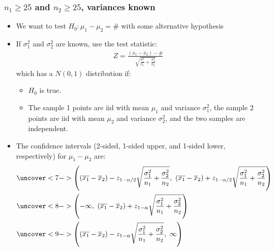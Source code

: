 \documentclass[handout]{beamer}\usepackage[]{graphicx}\usepackage[]{color}
\providecommand{\ov}[1]{\overline{#1}}
\numberwithin{equation}{section}
\begin{document}
\begin{frame}
\frametitle{$n_1 \ge 25$ and $n_2 \ge 25$, variances known} \scriptsize
\begin{itemize}
\item We want to test $H_0: \mu_1 - \mu_2 = \#$ with some alternative hypothesis
\pause \item If $\sigma^2_1$ and $\sigma_2^2$ are known, use the test statistic:
\pause \begin{align*}
Z = \frac{(\ov{x}_1 - \ov{x}_2) - \#}{\sqrt{\frac{\sigma^2_1}{n_1} + \frac{\sigma^2_2}{n_2}}}
\end{align*}
which has a $N(0,1)$ distribution if:
\begin{itemize}
\pause \item $H_0$ is true.
\pause \item The sample 1 points are iid with mean $\mu_1$ and variance $\sigma^2_1$, the sample 2 points are iid with mean $\mu_2$ and variance $\sigma^2_2$, and the two samples are independent.
\end{itemize}
\pause \item The confidence intervals (2-sided, 1-sided upper, and 1-sided lower, respectively) for $\mu_1 - \mu_2$ are:
\begin{align*}
&\uncover<7->{\left ((\ov{x_1} - \ov{x}_2) - z_{1 - \alpha/2} \sqrt{\frac{\sigma^2_1}{n_1} + \frac{\sigma^2_2}{n_2}} , \ (\ov{x_1} - \ov{x}_2) + z_{1 - \alpha/2} \sqrt{\frac{\sigma^2_1}{n_1} + \frac{\sigma^2_2}{n_2}} \right )} \\
&\uncover<8->{\left (-\infty , \ (\ov{x_1} - \ov{x}_2) + z_{1 - \alpha} \sqrt{\frac{\sigma^2_1}{n_1} + \frac{\sigma^2_2}{n_2}} \right )} \\
&\uncover<9->{\left ((\ov{x_1} - \ov{x}_2) - z_{1 - \alpha} \sqrt{\frac{\sigma^2_1}{n_1} + \frac{\sigma^2_2}{n_2}}, \ \infty \right )} 
\end{align*}
\end{itemize}
\end{frame}
\end{document}

